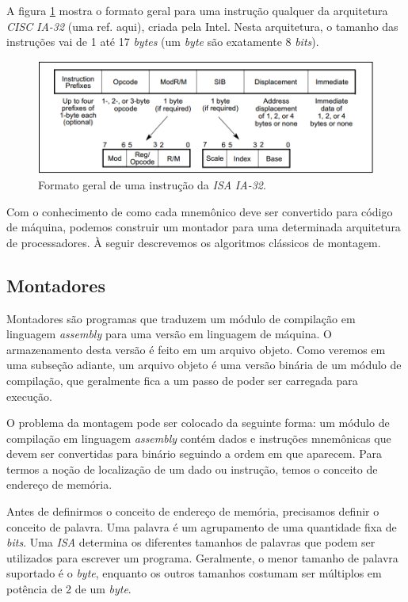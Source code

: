 A figura \ref{instrucoes_ia32} mostra o formato geral para uma instrução qualquer da arquitetura \textit{CISC} \textit{IA-32} (uma ref. aqui), criada pela Intel. Nesta arquitetura, o tamanho das instruções vai de 1 até 17 \textit{bytes} (um \textit{byte} são exatamente 8 \textit{bits}).

\begin{figure}[ptb]
  \begin{center}
    \includegraphics[scale=.45]{imagens/instrucoes_ia32}
  \end{center}
  \caption{Formato geral de uma instrução da \textit{ISA} \textit{IA-32}.}
  \label{instrucoes_ia32}
\end{figure}

Com o conhecimento de como cada mnemônico deve ser convertido para código de máquina, podemos construir um montador para uma determinada arquitetura de processadores. À seguir descrevemos os algoritmos clássicos de montagem.

\subsection{Montadores}

Montadores são programas que traduzem um módulo de compilação em linguagem \textit{assembly} para uma versão em linguagem de máquina. O armazenamento desta versão é feito em um arquivo objeto. Como veremos em uma subseção adiante, um arquivo objeto é uma versão binária de um módulo de compilação, que geralmente fica a um passo de poder ser carregada para execução.

O problema da montagem pode ser colocado da seguinte forma: um módulo de compilação em linguagem \textit{assembly} contém dados e instruções mnemônicas que devem ser convertidas para binário seguindo a ordem em que aparecem. Para termos a noção de localização de um dado ou instrução, temos o conceito de endereço de memória.

Antes de definirmos o conceito de endereço de memória, precisamos definir o conceito de palavra. Uma palavra é um agrupamento de uma quantidade fixa de \textit{bits}. Uma \textit{ISA} determina os diferentes tamanhos de palavras que podem ser utilizados para escrever um programa. Geralmente, o menor tamanho de palavra suportado é o \textit{byte}, enquanto os outros tamanhos costumam ser múltiplos em potência de 2 de um \textit{byte}.

